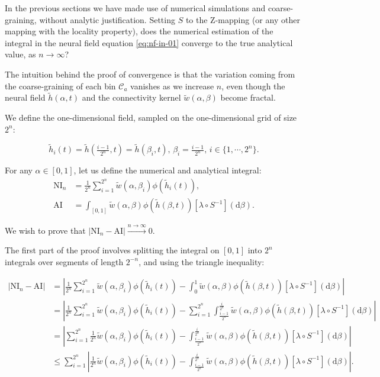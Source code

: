 \documentclass[10pt,letterpaper]{article}
\def\d{\mathrm d}
\begin{document}
In the previous sections we have made use of numerical simulations and coarse-graining, without analytic justification. Setting $S$ to the Z-mapping (or any other mapping with the locality property), does the numerical estimation of the integral in the neural field equation \autoref{eq:nf-in-01} converge to the true analytical value, as $n \to \infty$?

The intuition behind the proof of convergence is that the variation coming from the coarse-graining of each bin $\mathcal C_a$ vanishes as we increase $n$, even though the neural field $\tilde h(\alpha, t)$ and the connectivity kernel $\tilde w(\alpha, \beta)$ become fractal.

We define the one-dimensional field, sampled on the one-dimensional grid of size $2^n$:

$$
\tilde h_i(t) = \tilde h(\tfrac{i-1}{2^n}, t) = \tilde h(\beta_i, t),\,\beta_i=\tfrac{i-1}{2^n},\,i\in\{1,\cdots,2^n\}.
$$

For any $\alpha \in [0,1]$, let us define the numerical and analytical integral:
$$
\begin{aligned}
\mathrm{NI}_n &= \frac{1}{2^n} \sum_{i=1}^{2^n} \tilde w(\alpha, \beta_i) \phi(\tilde h_i(t)), \\
\mathrm{AI} &= \int_{[0,1]} \tilde w(\alpha, \beta) \phi(\tilde h(\beta, t)) \left[\lambda \circ S^{-1}\right](\d \beta).
\end{aligned}
$$

We wish to prove that $|\mathrm{NI}_n - \mathrm{AI}| \xrightarrow{n \to \infty} 0$.

The first part of the proof involves splitting the integral on $[0,1]$ into $2^n$ integrals over segments of length $2^{-n}$, and using the triangle inequality:

$$
\begin{aligned}
|\mathrm{NI}_n - \mathrm{AI}| &= \left| \frac{1}{2^n} \sum_{i=1}^{2^n} \tilde w(\alpha, \beta_i) \phi(\tilde h_i(t)) - \int_{0}^{1} \tilde w(\alpha, \beta) \phi(\tilde h(\beta, t)) \left[\lambda \circ S^{-1}\right](\d \beta) \right| \\
&= \left| \frac{1}{2^n} \sum_{i=1}^{2^n} \tilde w(\alpha, \beta_i) \phi(\tilde h_i(t)) - \sum_{i=1}^{2^n} \int_{\tfrac{i-1}{2^n}}^{\tfrac{i}{2^n}} \tilde w(\alpha, \beta) \phi(\tilde h(\beta, t)) \left[\lambda \circ S^{-1}\right](\d \beta) \right| \\
&= \left| \sum_{i=1}^{2^n} \frac{1}{2^n} \tilde w(\alpha, \beta_i) \phi(\tilde h_i(t)) - \int_{\tfrac{i-1}{2^n}}^{\tfrac{i}{2^n}} \tilde w(\alpha, \beta) \phi(\tilde h(\beta, t)) \left[\lambda \circ S^{-1}\right](\d \beta) \right| \\
&\leq \sum_{i=1}^{2^n} \left| \frac{1}{2^n} \tilde w(\alpha, \beta_i) \phi(\tilde h_i(t)) - \int_{\tfrac{i-1}{2^n}}^{\tfrac{i}{2^n}} \tilde w(\alpha, \beta) \phi(\tilde h(\beta, t)) \left[\lambda \circ S^{-1}\right](\d \beta) \right|.
\end{aligned}
$$
\end{document}
